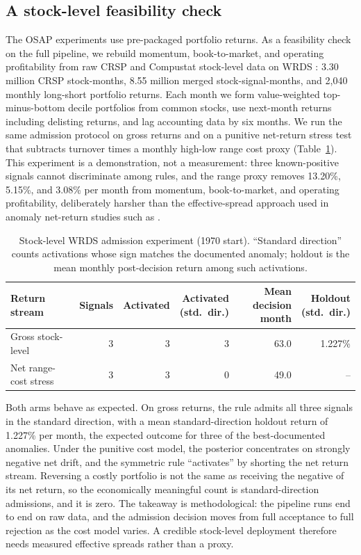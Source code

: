 \documentclass[11pt]{article}
\begin{document}
\subsection{A stock-level feasibility check}
\label{sec:wrds}

The OSAP experiments use pre-packaged portfolio returns.  As a feasibility check on
the full pipeline, we rebuild momentum, book-to-market, and operating profitability
from raw CRSP and Compustat stock-level data on WRDS \citep{wrdsPlatform}: 3.30
million CRSP stock-months, 8.55 million merged stock-signal-months, and 2{,}040
monthly long-short portfolio returns.  Each month we form value-weighted
top-minus-bottom decile portfolios from common stocks, use next-month returns
including delisting returns, and lag accounting data by six months.  We run the same
admission protocol on gross returns and on a punitive net-return stress test that
subtracts turnover times a monthly high-low range cost proxy
(Table~\ref{tab:wrds_stock_level}).  This experiment is a demonstration, not a
measurement: three known-positive signals cannot discriminate among rules, and the
range proxy removes 13.20\%, 5.15\%, and 3.08\% per month from momentum,
book-to-market, and operating profitability, deliberately harsher than the
effective-spread approach used in anomaly net-return studies such as
\citet{chenVelikov2023}.

\begin{table}[t]
\centering
\caption{Stock-level WRDS admission experiment (1970 start).  ``Standard direction''
counts activations whose sign matches the documented anomaly; holdout is the mean
monthly post-decision return among such activations.}
\label{tab:wrds_stock_level}
\small
\begin{tabular}{lrrrrr}
\toprule
Return stream & Signals & Activated & \makecell[r]{Activated\\(std.\ dir.)} &
\makecell[r]{Mean decision\\month} & \makecell[r]{Holdout\\(std.\ dir.)} \\
\midrule
Gross stock-level & 3 & 3 & 3 & 63.0 & 1.227\% \\
Net range-cost stress & 3 & 3 & 0 & 49.0 & -- \\
\bottomrule
\end{tabular}
\end{table}

Both arms behave as expected.  On gross returns, the rule admits all three signals
in the standard direction, with a mean standard-direction holdout return of 1.227\%
per month, the expected outcome for three of the best-documented anomalies.  Under the
punitive cost model, the posterior concentrates on strongly negative net drift, and
the symmetric rule ``activates'' by shorting the net return stream.  Reversing a
costly portfolio is not the same as receiving the negative of its net return, so the
economically meaningful count is standard-direction admissions, and it is zero.  The
takeaway is methodological: the pipeline runs end to end on raw data, and the
admission decision moves from full acceptance to full rejection as the cost model
varies.  A credible stock-level deployment therefore needs measured effective spreads
rather than a proxy.
\end{document}
